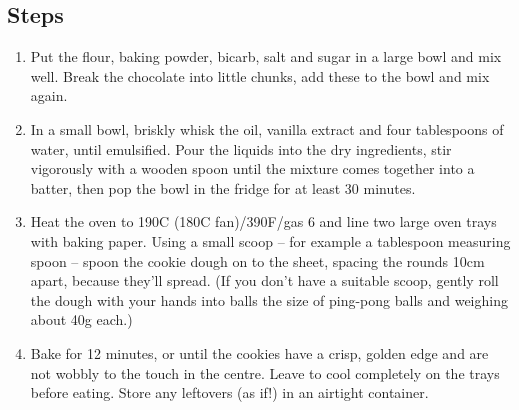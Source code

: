 \documentclass{book}
\begin{document}
\subsection*{Steps}
\begin{enumerate}
\item Put the flour, baking powder, bicarb, salt and sugar in a large bowl and mix well. Break the chocolate into little chunks, add these to the bowl and mix again.
\item In a small bowl, briskly whisk the oil, vanilla extract and four tablespoons of water, until emulsified. Pour the liquids into the dry ingredients, stir vigorously with a wooden spoon until the mixture comes together into a batter, then pop the bowl in the fridge for at least 30 minutes.
\item Heat the oven to 190C (180C fan)/390F/gas 6 and line two large oven trays with baking paper. Using a small scoop – for example a tablespoon measuring spoon – spoon the cookie dough on to the sheet, spacing the rounds 10cm apart, because they’ll spread. (If you don’t have a suitable scoop, gently roll the dough with your hands into balls the size of ping-pong balls and weighing about 40g each.)
\item Bake for 12 minutes, or until the cookies have a crisp, golden edge and are not wobbly to the touch in the centre. Leave to cool completely on the trays before eating. Store any leftovers (as if!) in an airtight container.
\end{enumerate}
\newpage
\end{document}
